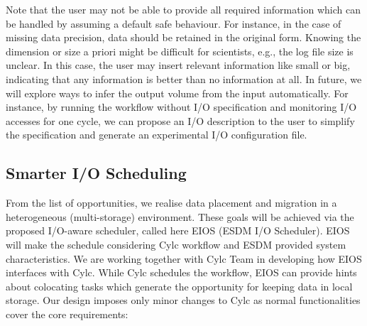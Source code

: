 \documentclass{superfri}
\begin{document}
Note that the user may not be able to provide all required information which can be handled by assuming a default safe behaviour.
For instance, in the case of missing data precision, data should be retained in the original form.
Knowing the dimension or size a priori might be difficult for scientists, e.g., the log file size is unclear.
In this case, the user may insert relevant information like small or big, indicating that any information is better than no information at all.
In future, we will explore ways to infer the output volume from the input automatically.
For instance, by running the workflow without I/O specification and monitoring I/O accesses for one cycle, we can propose an I/O description to the user to simplify the specification and generate an experimental I/O configuration file.

\subsection{Smarter I/O Scheduling}

From the list of opportunities, we realise data placement and migration in a heterogeneous (multi-storage) environment.
These goals will be achieved via the proposed I/O-aware scheduler, called here EIOS (ESDM I/O Scheduler).
EIOS will make the schedule considering Cylc workflow and ESDM provided system characteristics.
We are working together with Cylc Team in developing how EIOS interfaces with Cylc.
While Cylc schedules the workflow, EIOS can provide hints about colocating tasks which generate the opportunity for keeping data in local storage.
Our design imposes only minor changes to Cylc as normal functionalities cover the core requirements:
\end{document}
